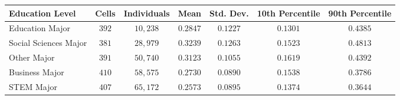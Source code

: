 \begin{tabular}{lcccccc}
\toprule
Education Level&Cells&Individuals&Mean&Std. Dev.&10th Percentile&90th Percentile\tabularnewline
\midrule
Education Major&$392$&$10,238$&$0.2847$&$0.1227$&$0.1301$&$0.4385$\tabularnewline
Social Sciences Major&$381$&$28,979$&$0.3239$&$0.1263$&$0.1523$&$0.4813$\tabularnewline
Other Major&$391$&$50,740$&$0.3123$&$0.1055$&$0.1619$&$0.4392$\tabularnewline
Business Major&$410$&$58,575$&$0.2730$&$0.0890$&$0.1538$&$0.3786$\tabularnewline
STEM Major&$407$&$65,172$&$0.2573$&$0.0895$&$0.1374$&$0.3644$\tabularnewline
\bottomrule
\end{tabular}
